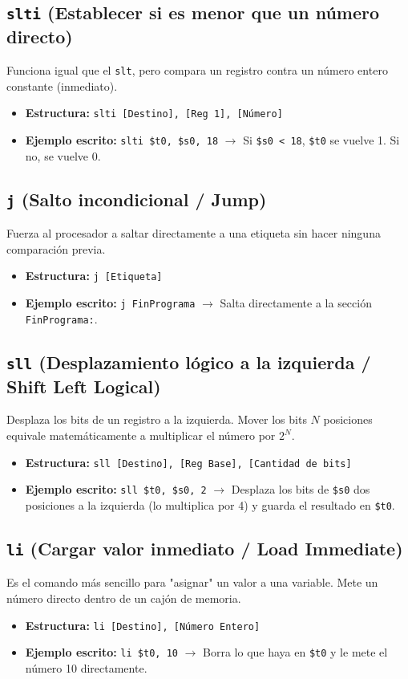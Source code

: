 \documentclass[12pt,a4paper]{article}
\begin{document}
\subsection{\texttt{slti} (Establecer si es menor que un número directo)}
Funciona igual que el \texttt{slt}, pero compara un registro contra un número entero constante (inmediato).
\begin{itemize}
    \item \textbf{Estructura:} \texttt{slti [Destino], [Reg 1], [Número]}
    \item \textbf{Ejemplo escrito:} \texttt{slti \$t0, \$s0, 18} $\rightarrow$ Si \texttt{\$s0 < 18}, \texttt{\$t0} se vuelve 1. Si no, se vuelve 0.
\end{itemize}

\subsection{\texttt{j} (Salto incondicional / Jump)}
Fuerza al procesador a saltar directamente a una etiqueta sin hacer ninguna comparación previa.
\begin{itemize}
    \item \textbf{Estructura:} \texttt{j [Etiqueta]}
    \item \textbf{Ejemplo escrito:} \texttt{j FinPrograma} $\rightarrow$ Salta directamente a la sección \texttt{FinPrograma:}.
\end{itemize}

\subsection{\texttt{sll} (Desplazamiento lógico a la izquierda / Shift Left Logical)}
Desplaza los bits de un registro a la izquierda. Mover los bits $N$ posiciones equivale matemáticamente a multiplicar el número por $2^N$.
\begin{itemize}
    \item \textbf{Estructura:} \texttt{sll [Destino], [Reg Base], [Cantidad de bits]}
    \item \textbf{Ejemplo escrito:} \texttt{sll \$t0, \$s0, 2} $\rightarrow$ Desplaza los bits de \texttt{\$s0} dos posiciones a la izquierda (lo multiplica por 4) y guarda el resultado en \texttt{\$t0}.
\end{itemize}

\subsection{\texttt{li} (Cargar valor inmediato / Load Immediate)}
Es el comando más sencillo para "asignar" un valor a una variable. Mete un número directo dentro de un cajón de memoria.
\begin{itemize}
    \item \textbf{Estructura:} \texttt{li [Destino], [Número Entero]}
    \item \textbf{Ejemplo escrito:} \texttt{li \$t0, 10} $\rightarrow$ Borra lo que haya en \texttt{\$t0} y le mete el número 10 directamente.
\end{itemize}
\end{document}
